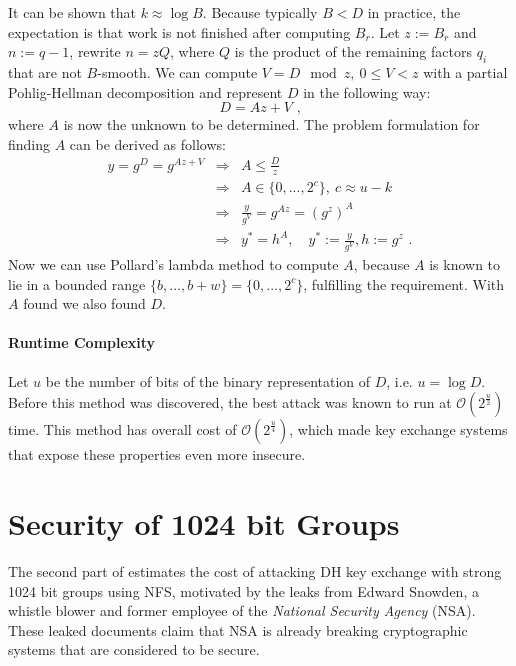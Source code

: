 \documentclass[paper=a4, fontsize=11pt]{scrartcl} %
\numberwithin{equation}{section} %
\numberwithin{figure}{section} %
\numberwithin{table}{section} %
\begin{document}
It can be shown that $k \approx \log B$. Because typically $B < D$ in practice, the expectation is that work is not finished after computing $B_r$. Let $z:=B_r$ and $n:=q-1$, rewrite $n=zQ$, where $Q$ is the product of the remaining factors $q_i$ that are not $B$-smooth. We can compute $V = D \mod z,\ 0\leq V<z$ with a partial Pohlig-Hellman decomposition and represent $D$ in the following way:
\begin{equation}
D = Az + V
\text{ ,}
\end{equation}
where $A$ is now the unknown to be determined. The problem formulation for finding $A$ can be derived as follows:
\begin{equation}
\begin{array}{lcl}
y=g^D=g^{Az+V} & \Rightarrow & A \leq \frac{D}{z}\\
& \Rightarrow & A\in\{0,...,2^c\},\ c\approx u-k\\
& \Rightarrow & \frac{y}{g^V} = g^{Az} = (g^z)^A\\
& \Rightarrow & y^* = h^A,\quad y^* := \frac{y}{g^V}, h := g^z
\text{ .}
\end{array}
\end{equation}
Now we can use Pollard's lambda method to compute $A$, because $A$ is known to lie in a bounded range $\{b,...,b+w\} = \{0,...,2^c\}$, fulfilling the requirement. With $A$ found we also found $D$.

\paragraph{Runtime Complexity} Let $u$ be the number of bits of the binary representation of $D$, i.e. $u = \log D$. Before this method was discovered, the best attack was known to run at $\mathcal{O}(2^{\frac{u}{2}})$ time. This method has overall cost of $\mathcal{O}(2^{\frac{u}{4}})$, which made key exchange systems that expose these properties even more insecure.

\section{Security of 1024 bit Groups}
The second part of \citep{Adrian:2015:IFS:2810103.2813707} estimates the cost of attacking DH key exchange with strong 1024 bit groups using NFS, motivated by the leaks from Edward Snowden, a whistle blower and former employee of the \textit{National Security Agency} (NSA). These leaked documents claim that NSA is already breaking cryptographic systems that are considered to be secure.
\end{document}

